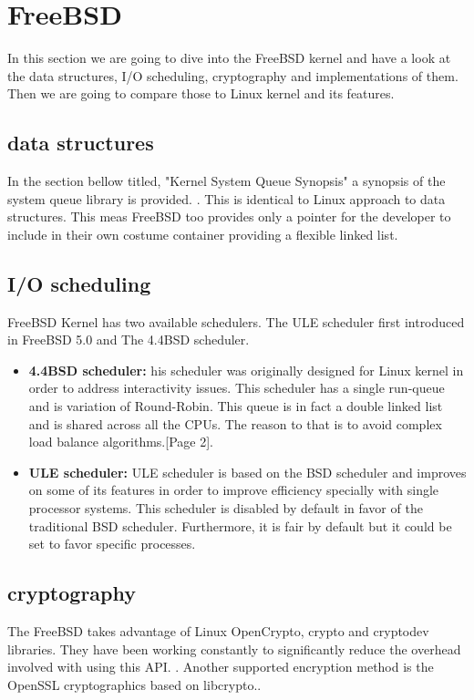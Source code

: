 \documentclass[journal,10pt,onecolumn,compsoc,letterpaper,draftclsnofoot,table,xcdraw]{IEEEtran} \usepackage[margin=0.75in]{geometry}
\begin{document}
\section{FreeBSD}
\noindent In this section we are going to dive into the FreeBSD kernel and have a look at the data structures, I/O scheduling, cryptography and implementations of them. Then we are going to compare those to Linux kernel and its features.
\subsection{data structures}
\noindent In the section bellow titled, "Kernel System Queue Synopsis" a synopsis of the system queue library is provided. \cite{11}. This is identical to Linux approach to data structures. This meas FreeBSD too provides only a pointer for the developer to include in their own costume container providing a flexible linked list.
\subsection{I/O scheduling}
\noindent FreeBSD Kernel has two available schedulers. The ULE scheduler first introduced in FreeBSD 5.0 and The 4.4BSD scheduler.
\begin{itemize}
\item \textbf{4.4BSD scheduler:} his scheduler was originally designed for Linux kernel in order to address interactivity issues. This scheduler has a single run-queue and is variation of Round-Robin. This queue is in fact a double linked list and is shared across all the CPUs. The reason to that is to avoid complex load balance algorithms.\cite{freebsdpdf}[Page 2].
\item \textbf{ULE scheduler:} ULE scheduler is based on the BSD scheduler and improves on some of its features in order to improve efficiency specially with single processor systems. This scheduler is disabled by default in favor of the traditional BSD scheduler. Furthermore, it is fair by default but it could be set to favor specific processes.
\end{itemize}
\subsection{cryptography}
\noindent The FreeBSD takes advantage of Linux OpenCrypto, crypto and cryptodev libraries. They have been working constantly to significantly reduce the overhead involved with using this API. \cite{12}. Another supported encryption method is the OpenSSL cryptographics based on libcrypto.\cite{13}.
\end{document}
